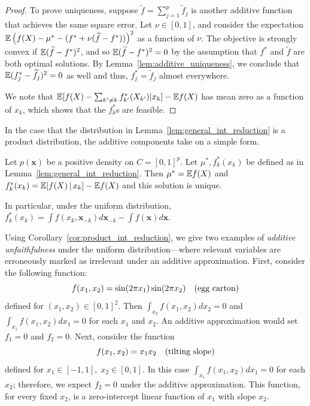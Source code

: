 \begin{proof}
To prove uniqueness, suppose $\tilde{f} = \sum_{j=1}^p \tilde{f}_j$ is
another additive function that achieves the same square error. Let
$\nu \in [0,1]$, and consider the expectation ${\mathbb E}\left( f(X) - \mu^* - (f^* + \nu
(\widetilde{f} - f^*)) \right)^2$ as a function of $\nu$. The objective is
strongly convex if ${\mathbb E} (\widetilde{f} - f^*)^2$, and so ${\mathbb E}( \widetilde{f} -
f^*)^2 = 0$ by the assumption that $f^*$ and $\tilde{f}$ are both
optimal solutions. By Lemma~\ref{lem:additive_uniqueness}, we conclude
that ${\mathbb E}( f^*_j - \widetilde{f}_j )^2 = 0$ as well and thus, $f^*_j =
\tilde{f}_j$ almost everywhere.

We note that ${\mathbb E}[ f(X) -\sum_{k'\neq k} f^*_{k'}(X_{k'}) | x_k] - {\mathbb E}
f(X)$ has mean zero as a function of $x_k$, which shows that the $f^*_k$s
are feasible.
\end{proof} 

In the case that the distribution in
Lemma~\ref{lem:general_int_reduction} is a product distribution, 
the additive components take on a simple form.

\begin{corollary}
\label{cor:product_int_reduction}
Let $p(\mathbf{x})$ be a positive density on $C=[0,1]^p$.
Let $\mu^*, f^*_k(x_k)$ be defined as in Lemma~\ref{lem:general_int_reduction}.
Then $\mu^* = {\mathbb E} f(X)$ and $f^*_k(x_k) = {\mathbb E}[ f(X) {\,|\,} x_k] - {\mathbb E} f(X)$ and this solution is unique.
\end{corollary}

In particular, under the uniform distribution, $f^*_k(x_k) = \displaystyle\int f(x_k, \mathbf{x}_{-k}) d\mathbf{x}_{-k} - \int f(\mathbf{x}) d\mathbf{x}$.


\begin{example} Using Corollary~\ref{cor:product_int_reduction}, we
  give two examples of \emph{additive unfaithfulness} under the
  uniform distribution---where relevant variables are
  erroneously marked as irrelevant under an additive
  approximation. First, consider the following function:
\begin{equation}
f(x_1, x_2) = \sin( 2\pi x_1) \sin( 2 \pi x_2)\quad
\textrm{(egg carton)} 
\end{equation}
defined for $(x_1, x_2) \in [0,1]^2$.  Then
$\displaystyle\int_{x_2} f(x_1, x_2) d x_2 = 0$ and
$\displaystyle\int_{x_1} f(x_1, x_2) d x_1 = 0$ for each $x_1$ and $x_2$. An additive approximation
would set $f_1 = 0$ and $f_2 = 0$.  Next, consider the function
\begin{equation}
f(x_1, x_2) = x_1 x_2 \quad \textrm{(tilting slope)} 
\end{equation}
defined for $x_1 \in [-1,1],\; x_2 \in [0,1]$.  In this case
$\displaystyle\int_{x_1} f(x_1, x_2) d x_1 = 0$ for each $x_2$; therefore, we expect $f_2 = 0$ under the additive approximation. This function, for every fixed $x_2$, is a zero-intercept linear function of $x_1$ with slope $x_2$.
\end{example}

